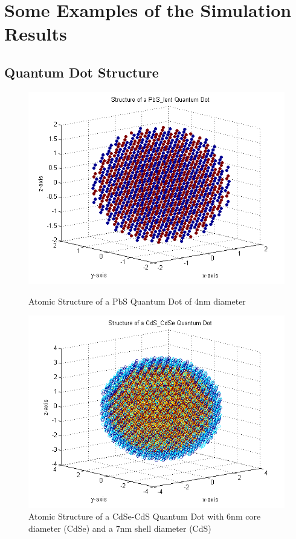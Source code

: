 \documentclass[a4paper, 11pt, landscape]{article}
\begin{document}
	\newpage
	
	\section{Some Examples of the Simulation Results}
		\subsection{Quantum Dot Structure}
			\begin{figure}[htbp]
				\begin{minipage}[t]{0.48\textwidth}
						\includegraphics[width=\textwidth]{figures/StructurePlotPbS.png}
						\caption{Atomic Structure of a PbS Quantum Dot of 4nm diameter}
				\end{minipage}
				\hfill
				\begin{minipage}[t]{0.48\textwidth}
						\includegraphics[width=\textwidth]{figures/StructurePlotCdS_CdSe.png}
						\caption{Atomic Structure of a CdSe-CdS Quantum Dot with 6nm core
										 diameter (CdSe) and a 7nm shell diameter (CdS)}
				\end{minipage}
			\end{figure}
		
\end{document}
